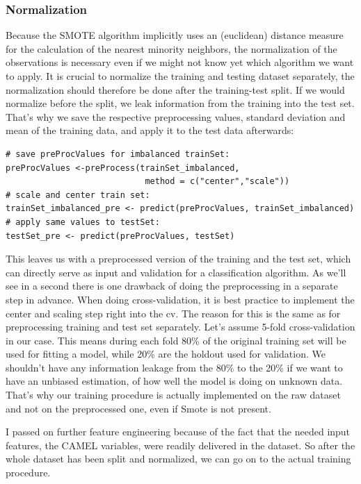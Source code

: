 \documentclass[12pt,a4paper]{article}
\begin{document}
\subsubsection*{Normalization}
Because the SMOTE algorithm implicitly uses an (euclidean) distance measure for the calculation of the nearest minority neighbors, the normalization of the observations is necessary even if we might not know yet which algorithm we want to apply. It is crucial to normalize the training and testing dataset separately, the normalization should therefore be done after the training-test split. If we would normalize before the split, we leak information from the training into the test set. That's why we save the respective preprocessing values, standard deviation and mean of the training data, and apply it to the test data afterwards:
\begin{verbatim}
# save preProcValues for imbalanced trainSet:
preProcValues <-preProcess(trainSet_imbalanced, 
                            method = c("center","scale")) 
# scale and center train set:
trainSet_imbalanced_pre <- predict(preProcValues, trainSet_imbalanced) 
# apply same values to testSet:
testSet_pre <- predict(preProcValues, testSet)                         
\end{verbatim}
This leaves us with a preprocessed version of the training and the test set, which can directly serve as input and validation for a classification algorithm. As we'll see in a second there is one drawback of doing the preprocessing in a separate step in advance. When doing cross-validation, it is best practice to implement the center and scaling step right into the cv. The reason for this is the same as for preprocessing training and test set separately. Let's assume 5-fold cross-validation in our case. This means during each fold 80\% of the original training set will be used for fitting a model, while 20\% are the holdout used for validation. We shouldn't have any information leakage from the 80\% to the 20\% if we want to have an unbiased estimation, of how well the model is doing on unknown data. That's why our training procedure is actually implemented on the raw dataset and not on the preprocessed one, even if Smote is not present.

I passed on further feature engineering because of the fact that the needed input features, the CAMEL variables, were readily delivered in the dataset. So after the whole dataset has been split and normalized, we can go on to the actual training procedure.
\end{document}
